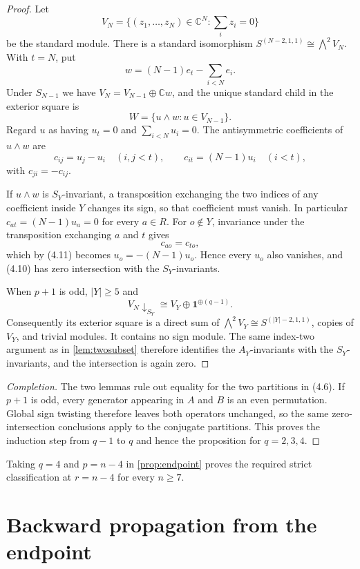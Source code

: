\documentclass[11pt]{article}
\theoremstyle{definition}
\newcommand{\C}{\mathbb C}
\newcommand{\one}{\mathbf 1}
\begin{document}
\begin{proof}
Let
\[
 V_N=\{(z_1,\dots,z_N)\in\C^N:\textstyle\sum_i z_i=0\}
\]
be the standard module.  There is a standard isomorphism
$S^{(N-2,1,1)}\cong\bigwedge^2V_N$.  With $t=N$, put
\[
 w=(N-1)e_t-\sum_{i<N}e_i.
\]
Under $S_{N-1}$ we have $V_N=V_{N-1}\oplus\C w$, and the unique standard
child in the exterior square is
\[
 W=\{u\wedge w:u\in V_{N-1}\}.
 \tag{4.10}
\]
Regard $u$ as having $u_t=0$ and $\sum_{i<N}u_i=0$.  The antisymmetric
coefficients of $u\wedge w$ are
\[
 c_{ij}=u_j-u_i\quad(i,j<t),\qquad
 c_{it}=(N-1)u_i\quad(i<t),
 \tag{4.11}
\]
with $c_{ji}=-c_{ij}$.

If $u\wedge w$ is $S_Y$-invariant, a transposition exchanging the two
indices of any coefficient inside $Y$ changes its sign, so that coefficient
must vanish.  In particular $c_{at}=(N-1)u_a=0$ for every $a\in R$.  For
$o\notin Y$, invariance under the transposition exchanging $a$ and $t$ gives
\[
 c_{ao}=c_{to},
\]
which by (4.11) becomes $u_o=-(N-1)u_o$.  Hence every $u_o$ also vanishes,
and (4.10) has zero intersection with the $S_Y$-invariants.

When $p+1$ is odd, $|Y|\geq5$ and
\[
 V_N\!\downarrow_{S_Y}\cong V_Y\oplus\one^{\oplus(q-1)}.
\]
Consequently its exterior square is a direct sum of
$\bigwedge^2V_Y\cong S^{(|Y|-2,1,1)}$, copies of $V_Y$, and trivial
modules.  It contains no sign module.  The same index-two argument as in
\cref{lem:twosubset} therefore identifies the $A_Y$-invariants with the
$S_Y$-invariants, and the intersection is again zero.
\end{proof}

\begin{proof}[Completion]
The two lemmas rule out equality for the two partitions in (4.6).  If
$p+1$ is odd, every generator appearing in $A$ and $B$ is an even
permutation.  Global sign twisting therefore leaves both operators
unchanged, so the same zero-intersection conclusions apply to the conjugate
partitions.  This proves the induction step from $q-1$ to $q$ and hence the
proposition for $q=2,3,4$.
\end{proof}

Taking $q=4$ and $p=n-4$ in \cref{prop:endpoint} proves the required strict
classification at $r=n-4$ for every $n\geq7$.

\section{Backward propagation from the endpoint}\label{sec:backward}
\end{document}
